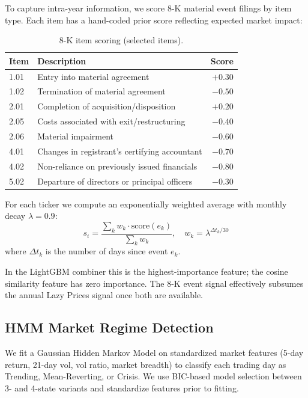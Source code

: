 \documentclass[11pt,a4paper]{article}
\begin{document}
To capture intra-year information, we score 8-K material event filings by item type. Each item has a hand-coded prior score reflecting expected market impact:

\begin{table}[H]
\centering
\caption{8-K item scoring (selected items).}
\label{tab:8k_scores}
\begin{tabular}{llr}
\toprule
Item & Description & Score \\
\midrule
1.01 & Entry into material agreement & $+0.30$ \\
1.02 & Termination of material agreement & $-0.50$ \\
2.01 & Completion of acquisition/disposition & $+0.20$ \\
2.05 & Costs associated with exit/restructuring & $-0.40$ \\
2.06 & Material impairment & $-0.60$ \\
4.01 & Changes in registrant's certifying accountant & $-0.70$ \\
4.02 & Non-reliance on previously issued financials & $-0.80$ \\
5.02 & Departure of directors or principal officers & $-0.30$ \\
\bottomrule
\end{tabular}
\end{table}

For each ticker we compute an exponentially weighted average with monthly decay $\lambda = 0.9$:
\begin{equation}
    s_i = \frac{\sum_{k} w_k \cdot \text{score}(e_k)}{\sum_k w_k}, \quad w_k = \lambda^{\Delta t_k / 30}
\end{equation}
where $\Delta t_k$ is the number of days since event $e_k$.

In the LightGBM combiner this is the highest-importance feature; the cosine similarity feature has zero importance. The 8-K event signal effectively subsumes the annual Lazy Prices signal once both are available.

\subsection{HMM Market Regime Detection}
\label{sec:regime}

We fit a Gaussian Hidden Markov Model on standardized market features (5-day return, 21-day vol, vol ratio, market breadth) to classify each trading day as Trending, Mean-Reverting, or Crisis. We use BIC-based model selection between 3- and 4-state variants and standardize features prior to fitting.
\end{document}
